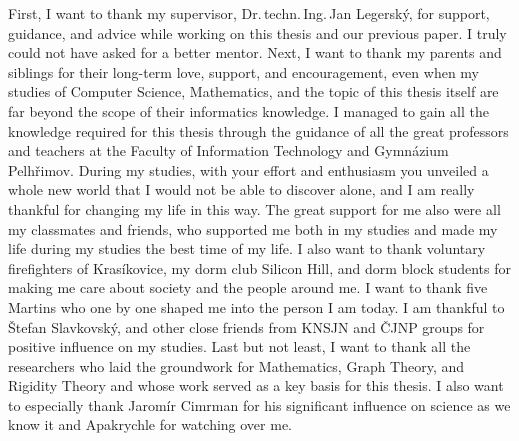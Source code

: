 \documentclass[english,bachelor,unicode,oneside,bw]{ctufit-thesis}
\begin{document}
\frontmatter\frontmatterinit{} %

\thispagestyle{empty}\maketitle\thispagestyle{empty}\cleardoublepage{} %


\imprintpage{} %
\stopTOCentries{} %


\begin{acknowledgmentpage}
	First, I want to thank my supervisor, Dr.\,techn.\,Ing.\,Jan Legerský,
	for support, guidance, and advice while working on this thesis and our previous paper.
	I truly could not have asked for a better mentor.
	Next, I want to thank my parents and siblings for their
	long-term love, support, and encouragement,
	even when my studies of Computer Science, Mathematics,
	and the topic of this thesis itself
	are far beyond the scope of their informatics knowledge.
	I managed to gain all the knowledge required for this thesis
	through the guidance of all the great professors
	and teachers at the Faculty of Information Technology and Gymnázium Pelhřimov.
	During my studies, with your effort and enthusiasm
	you unveiled a whole new world
	that I would not be able to discover alone,
	and I am really thankful for changing my life in this way.
	The great support for me also were all my classmates and friends,
	who supported me both in my studies and made my life during my studies
	the best time of my life.
	I also want to thank voluntary firefighters of Krasíkovice, my dorm club
	Silicon Hill, and dorm block students for making me care about society and the people around me.
	I want to thank five Martins who one by one
	shaped me into the person I am today.
	I am thankful to Štefan Slavkovský,
	and other close friends from KNSJN and ČJNP groups
	for positive influence on my studies.
	Last but not least, I want to thank all the researchers
	who laid the groundwork for Mathematics, Graph Theory, and Rigidity Theory
	and whose work served as a key basis for this thesis.
	I also want to especially thank Jaromír Cimrman
	for his significant influence on science as we know it
	and Apakrychle for watching over me.
\end{acknowledgmentpage}
\end{document}
